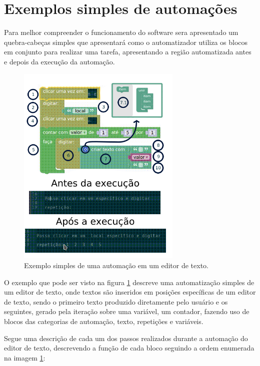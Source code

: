 \documentclass[tg]{mdtufsm}
\begin{document}
            \section {Exemplos simples de automações}

                Para melhor compreender o funcionamento do software sera apresentado um quebra-cabeças simples que apresentará como o automatizador utiliza os blocos em conjunto para realizar uma tarefa, apresentando a região automatizada antes e depois da execução da automação.

                \begin{figure}[!htb]
                    {\centering
                    \includegraphics[width=0.7\textwidth]{imagens/simpleBlockly.png}
                    \caption{Exemplo simples de uma automação em um editor de texto.}
                    \label{fig:simpleBlockly}}
                \end{figure}

                O exemplo que pode ser visto na figura \ref{fig:simpleBlockly} descreve uma automatização simples de um editor de texto, onde textos são inseridos em posições específicas de um editor de texto, sendo o primeiro texto produzido diretamente pelo usuário e os seguintes, gerado pela iteração sobre uma variável, um contador, fazendo uso de blocos das categorias de automação, texto, repetições e variáveis.

                Segue uma descrição de cada um dos passos realizados durante a automação do editor de texto, descrevendo a função de cada bloco seguindo a ordem enumerada na imagem \ref{fig:simpleBlockly}:
\end{document}
